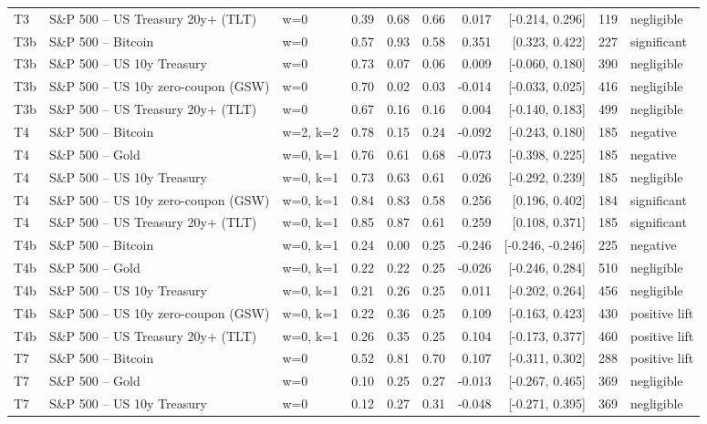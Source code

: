\begin{figure}
\begin{tabular}{lllrrrrrrl}
T3 & S\&P 500 -- US Treasury 20y+ (TLT) & w=0 & 0.39 & 0.68 & 0.66 & 0.017 & [-0.214, 0.296] & 119 & negligible \\
T3b & S\&P 500 -- Bitcoin & w=0 & 0.57 & 0.93 & 0.58 & 0.351 & [0.323, 0.422] & 227 & significant \\
T3b & S\&P 500 -- US 10y Treasury & w=0 & 0.73 & 0.07 & 0.06 & 0.009 & [-0.060, 0.180] & 390 & negligible \\
T3b & S\&P 500 -- US 10y zero-coupon (GSW) & w=0 & 0.70 & 0.02 & 0.03 & -0.014 & [-0.033, 0.025] & 416 & negligible \\
T3b & S\&P 500 -- US Treasury 20y+ (TLT) & w=0 & 0.67 & 0.16 & 0.16 & 0.004 & [-0.140, 0.183] & 499 & negligible \\
T4 & S\&P 500 -- Bitcoin & w=2, k=2 & 0.78 & 0.15 & 0.24 & -0.092 & [-0.243, 0.180] & 185 & negative \\
T4 & S\&P 500 -- Gold & w=0, k=1 & 0.76 & 0.61 & 0.68 & -0.073 & [-0.398, 0.225] & 185 & negative \\
T4 & S\&P 500 -- US 10y Treasury & w=0, k=1 & 0.73 & 0.63 & 0.61 & 0.026 & [-0.292, 0.239] & 185 & negligible \\
T4 & S\&P 500 -- US 10y zero-coupon (GSW) & w=0, k=1 & 0.84 & 0.83 & 0.58 & 0.256 & [0.196, 0.402] & 184 & significant \\
T4 & S\&P 500 -- US Treasury 20y+ (TLT) & w=0, k=1 & 0.85 & 0.87 & 0.61 & 0.259 & [0.108, 0.371] & 185 & significant \\
T4b & S\&P 500 -- Bitcoin & w=0, k=1 & 0.24 & 0.00 & 0.25 & -0.246 & [-0.246, -0.246] & 225 & negative \\
T4b & S\&P 500 -- Gold & w=0, k=1 & 0.22 & 0.22 & 0.25 & -0.026 & [-0.246, 0.284] & 510 & negligible \\
T4b & S\&P 500 -- US 10y Treasury & w=0, k=1 & 0.21 & 0.26 & 0.25 & 0.011 & [-0.202, 0.264] & 456 & negligible \\
T4b & S\&P 500 -- US 10y zero-coupon (GSW) & w=0, k=1 & 0.22 & 0.36 & 0.25 & 0.109 & [-0.163, 0.423] & 430 & positive lift \\
T4b & S\&P 500 -- US Treasury 20y+ (TLT) & w=0, k=1 & 0.26 & 0.35 & 0.25 & 0.104 & [-0.173, 0.377] & 460 & positive lift \\
T7 & S\&P 500 -- Bitcoin & w=0 & 0.52 & 0.81 & 0.70 & 0.107 & [-0.311, 0.302] & 288 & positive lift \\
T7 & S\&P 500 -- Gold & w=0 & 0.10 & 0.25 & 0.27 & -0.013 & [-0.267, 0.465] & 369 & negligible \\
T7 & S\&P 500 -- US 10y Treasury & w=0 & 0.12 & 0.27 & 0.31 & -0.048 & [-0.271, 0.395] & 369 & negligible \\

\end{tabular}
\end{figure}
